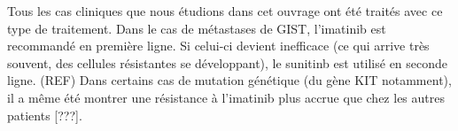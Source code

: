 \documentclass[main.tex]{subfiles}
\begin{document}
Tous les cas cliniques que nous étudions dans cet ouvrage ont été traités avec ce type de traitement. Dans le cas de métastases de GIST, l'imatinib est recommandé en première ligne. Si celui-ci devient inefficace (ce qui arrive très souvent, des cellules résistantes se développant), le sunitinb est utilisé en seconde ligne. (REF)
Dans certains cas de mutation génétique (du gène KIT notamment), il a même été montrer une résistance à l'imatinib plus accrue que chez les autres patients [???].

%
%
\end{document}
